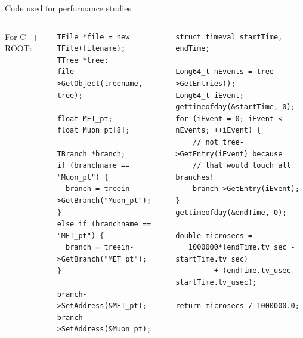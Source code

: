 \documentclass[aspectratio=169]{beamer}
\begin{document}
\begin{frame}[fragile]{Code used for performance studies}
\vspace{0.25 cm}
\scriptsize

\begin{columns}[b]
{\normalsize For C++ ROOT:}

\begin{verbatim}
TFile *file = new TFile(filename);
TTree *tree;
file->GetObject(treename, tree);

float MET_pt;
float Muon_pt[8];

TBranch *branch;
if (branchname == "Muon_pt") {
  branch = treein->GetBranch("Muon_pt");
}
else if (branchname == "MET_pt") {
  branch = treein->GetBranch("MET_pt");
}

branch->SetAddress(&MET_pt);
branch->SetAddress(&Muon_pt);
\end{verbatim}

\begin{verbatim}
struct timeval startTime, endTime;

Long64_t nEvents = tree->GetEntries();
Long64_t iEvent;
gettimeofday(&startTime, 0);
for (iEvent = 0; iEvent < nEvents; ++iEvent) {
    // not tree->GetEntry(iEvent) because
    // that would touch all branches!
    branch->GetEntry(iEvent);
}
gettimeofday(&endTime, 0);

double microsecs =
   1000000*(endTime.tv_sec - startTime.tv_sec)
         + (endTime.tv_usec - startTime.tv_usec);

return microsecs / 1000000.0;
\end{verbatim}
\end{columns}
\end{frame}
\end{document}
